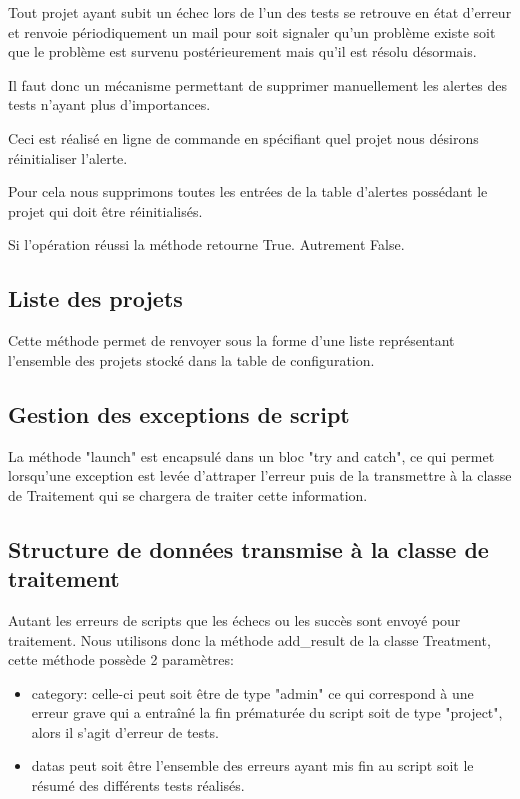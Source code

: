 Tout projet ayant subit un échec lors de l'un des tests se retrouve en état d'erreur et renvoie périodiquement un mail pour soit signaler qu'un problème existe soit que le problème est survenu postérieurement mais qu'il est résolu désormais. 

Il faut donc un mécanisme permettant de supprimer manuellement les alertes des tests n'ayant plus d'importances.

Ceci est réalisé en ligne de commande en spécifiant quel projet nous désirons réinitialiser l'alerte.

Pour cela nous supprimons toutes les entrées de la table d'alertes possédant le projet qui doit être réinitialisés. 

Si l'opération réussi la méthode retourne True. Autrement False.

\subsection*{Liste des projets}

Cette méthode permet de renvoyer sous la forme d'une liste représentant l'ensemble des projets stocké dans la table de configuration.

\subsection*{Gestion des exceptions de script}

La méthode "launch" est encapsulé dans un bloc "try and catch", ce qui permet lorsqu'une exception est levée d'attraper l'erreur puis de la transmettre à la classe de Traitement qui se chargera de traiter cette information.

\subsection*{Structure de données transmise à la classe de traitement}

Autant les erreurs de scripts que les échecs ou les succès sont envoyé pour traitement. Nous utilisons donc la méthode add\_result de la classe Treatment, cette méthode possède 2 paramètres:

\begin{itemize}
\item  category: celle-ci peut soit être de type "admin" ce qui correspond à une erreur grave qui a entraîné la fin prématurée du script soit de type "project", alors il s'agit d'erreur de tests.
\item datas peut soit être l'ensemble des erreurs ayant mis fin au script soit le résumé des différents tests réalisés.
\end{itemize}


